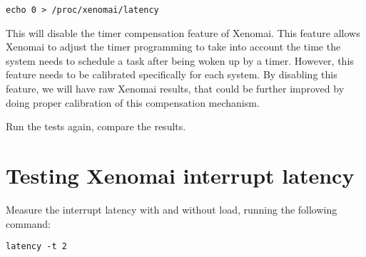 \begin{verbatim}
echo 0 > /proc/xenomai/latency
\end{verbatim}

This will disable the timer compensation feature of Xenomai. This
feature allows Xenomai to adjust the timer programming to take into
account the time the system needs to schedule a task after being woken
up by a timer. However, this feature needs to be calibrated
specifically for each system. By disabling this feature, we will have
raw Xenomai results, that could be further improved by doing proper
calibration of this compensation mechanism.

Run the tests again, compare the results.

\section{Testing Xenomai interrupt latency}

Measure the interrupt latency with and without load, running the
following command:

\begin{verbatim}
latency -t 2
\end{verbatim}
